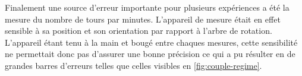 Finalement une source d'erreur importante pour plusieurs expériences a été la mesure du nombre de tours par minutes. L'appareil de mesure était en effet sensible à sa position et son orientation par rapport à l'arbre de rotation. L'appareil étant tenu à la main et bougé entre chaques mesures, cette sensibilité ne permettait donc pas d'assurer une bonne précision ce qui a pu résulter en de grandes barres d'erreurs telles que celles visibles en \autoref{fig:couple-regime}.